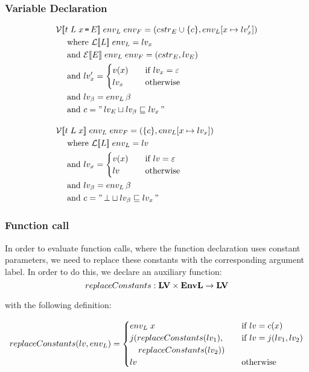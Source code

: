 \subsubsection{Variable Declaration}
\begin{align*}
  & \iV\dblSq{t \; L \; x \tk = E} \; \ienvL \; \ienvF = (\icstr_E \cup \{ c \}, \ienvL[x \mapsto \ilv_x']) \\
  & \dsWhere{\iL\dblSq{L} \; \ienvL = \ilv_x} \\
  & \dsAnd{\iE\dblSq{E} \; \ienvL \; \ienvF = (\icstr_E, \ilv_E)} \\
  & \dsAnd{\ilv_x' = \begin{cases}
  v(x) & \quad \text{if } \ilv_x = \varepsilon \\
  \ilv_x & \quad \text{otherwise}
  \end{cases}} \\
  & \dsAnd{\ilv_\ib = \ienvL \, \ib} \\
  & \dsAnd{c = \literal{\ilv_E \sqcup \ilv_\ib \sqsubseteq \ilv_x}} \rspace
  & \iV\dblSq{t \; L \; x} \; \ienvL \; \ienvF = (\{ c \}, \ienvL[x \mapsto \ilv_x])\\
  & \dsWhere{\iL\dblSq{L} \; \ienvL = \ilv} \\
  & \dsAnd{\ilv_x = \begin{cases}
  v(x) & \quad \text{if } \ilv = \varepsilon \\
  \ilv & \quad \text{otherwise}
  \end{cases}} \\
  & \dsAnd{\ilv_\ib = \ienvL \, \ib} \\
  & \dsAnd{c = \literal{\bot \sqcup \ilv_\ib \sqsubseteq \ilv_x}}
\end{align*}

\subsubsection{Function call}
In order to evaluate function calls, where the function declaration uses constant parameters, we need to replace these constants with the corresponding argument label.
In order to do this, we declare an auxiliary function:
\[ replaceConstants : \mathbf{LV} \times \mathbf{EnvL} \rightarrow \mathbf{LV} \]

with the following definition:

\[replaceConstants(lv, {env_L}) = \begin{cases}
  {env_L} \; x & \quad \text{if } lv = c(x) \\
  j(replaceConstants(lv_1), & \quad \text{if } lv = j(lv_1, lv_2) \\
  \quad replaceConstants(lv_2)) & \\
  lv & \quad \text{otherwise}
\end{cases} \]

